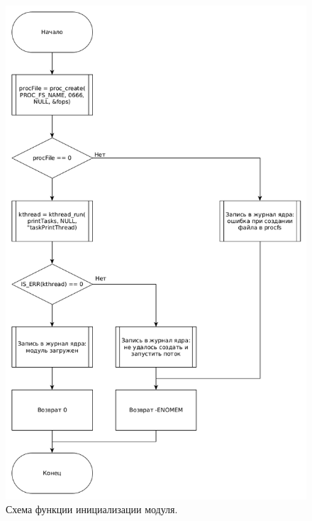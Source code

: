 \begin{figure}[H]
	\centering
	\includegraphics[scale=0.5]{img/init.png}
	\caption{Схема функции инициализации модуля.}
	\label{fig:init}
\end{figure}

